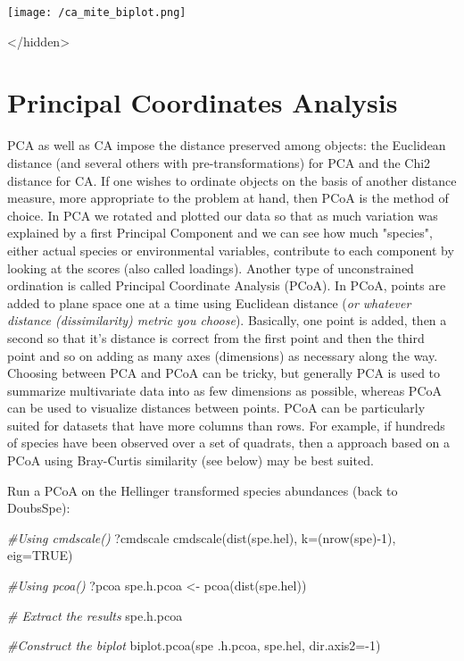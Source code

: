 \documentclass[
]{book}
\newenvironment{Shaded}{\begin{snugshade}}{\end{snugshade}}
\newcommand{\AttributeTok}[1]{\textcolor[rgb]{0.77,0.63,0.00}{#1}}
\newcommand{\CommentTok}[1]{\textcolor[rgb]{0.56,0.35,0.01}{\textit{#1}}}
\newcommand{\ConstantTok}[1]{\textcolor[rgb]{0.00,0.00,0.00}{#1}}
\newcommand{\DecValTok}[1]{\textcolor[rgb]{0.00,0.00,0.81}{#1}}
\newcommand{\FunctionTok}[1]{\textcolor[rgb]{0.00,0.00,0.00}{#1}}
\newcommand{\NormalTok}[1]{#1}
\newcommand{\OtherTok}[1]{\textcolor[rgb]{0.56,0.35,0.01}{#1}}
\newcommand{\SpecialCharTok}[1]{\textcolor[rgb]{0.00,0.00,0.00}{#1}}
\begin{document}
\texttt{[image: /ca\_mite\_biplot.png]}

\textless/hidden\textgreater{}

\hypertarget{principal-coordinates-analysis}{%
\chapter{Principal Coordinates Analysis}\label{principal-coordinates-analysis}}

PCA as well as CA impose the distance preserved among objects: the
Euclidean distance (and several others with pre-transformations) for PCA
and the Chi2 distance for CA. If one wishes to ordinate objects on the
basis of another distance measure, more appropriate to the problem at
hand, then PCoA is the method of choice. In PCA we rotated and plotted
our data so that as much variation was explained by a first Principal
Component and we can see how much "species", either actual species or
environmental variables, contribute to each component by looking at the
scores (also called loadings). Another type of unconstrained ordination
is called Principal Coordinate Analysis (PCoA). In PCoA, points are
added to plane space one at a time using Euclidean distance (\emph{or
whatever distance (dissimilarity) metric you choose}). Basically, one
point is added, then a second so that it's distance is correct from the
first point and then the third point and so on adding as many axes
(dimensions) as necessary along the way. Choosing between PCA and PCoA
can be tricky, but generally PCA is used to summarize multivariate data
into as few dimensions as possible, whereas PCoA can be used to
visualize distances between points. PCoA can be particularly suited for
datasets that have more columns than rows. For example, if hundreds of
species have been observed over a set of quadrats, then a approach based
on a PCoA using Bray-Curtis similarity (see below) may be best suited.

Run a PCoA on the Hellinger transformed species abundances (back to
DoubsSpe):

\begin{Shaded}
\begin{Highlighting}[]
\CommentTok{\#Using cmdscale()}
\NormalTok{?cmdscale}
\FunctionTok{cmdscale}\NormalTok{(}\FunctionTok{dist}\NormalTok{(spe.hel), }\AttributeTok{k=}\NormalTok{(}\FunctionTok{nrow}\NormalTok{(spe)}\SpecialCharTok{{-}}\DecValTok{1}\NormalTok{), }\AttributeTok{eig=}\ConstantTok{TRUE}\NormalTok{)}

\CommentTok{\#Using pcoa()}
\NormalTok{?pcoa}
\NormalTok{spe.h.pcoa }\OtherTok{\textless{}{-}} \FunctionTok{pcoa}\NormalTok{(}\FunctionTok{dist}\NormalTok{(spe.hel))}

\CommentTok{\# Extract the results}
\NormalTok{spe.h.pcoa }

\CommentTok{\#Construct the biplot}
\FunctionTok{biplot.pcoa}\NormalTok{(spe .h.pcoa, spe.hel, }\AttributeTok{dir.axis2=}\SpecialCharTok{{-}}\DecValTok{1}\NormalTok{)}
\end{Highlighting}
\end{Shaded}
\end{document}
